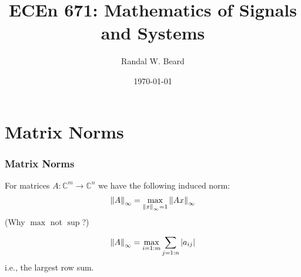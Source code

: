 \documentclass{beamer}
\title{ECEn 671: Mathematics of Signals and Systems}
\author{Randal W. Beard}
\institute{Brigham Young University}
\date{\today}
\begin{document}
\begin{frame}
	\titlepage
\end{frame}


\section{Matrix Norms}
\frame{\sectionpage}

\begin{frame}\frametitle{Matrix Norms}
	For matrices $A: \mathbb{C}^m \to \mathbb{C}^n$ we have the following induced norm:  
	\[ 
	\left\| A \right\|_{\infty} = \max_{\left\| x \right\|_{\infty} = 1} \left\| Ax \right\|_{\infty} 
	\]
	(Why $\max$ not $\sup$?)
	
	\vfill
	
	\begin{lemma}
	\[ 
	\left\| A \right\|_{\infty} = \max_{i=1:m} \sum_{j=1:n} \left|a_{ij}\right|
	\]
	i.e., the largest row sum.
	\end{lemma}
\end{frame}
\end{document}
